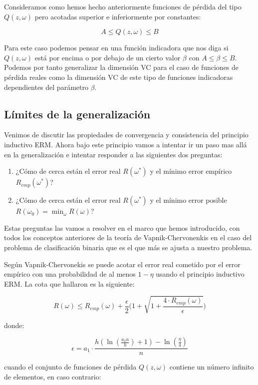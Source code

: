 Consideramos como hemos hecho anteriormente funciones de pérdida del tipo $Q(z,\omega)$ pero acotadas superior e inferiormente por constantes:

$$A\leq Q(z,\omega) \leq B$$

Para este caso podemos pensar en una función indicadora que nos diga si $Q(z,\omega)$ está por encima o por debajo de un cierto valor $\beta$ con $A\leq \beta \leq B$. Podemos por tanto generalizar la dimensión VC para el caso de funciones de pérdida reales como la dimensión VC de este tipo de funciones indicadoras dependientes del parámetro $\beta$.

\subsection{Límites de la generalización}

Venimos de discutir las propiedades de convergencia y consistencia del principio inductivo ERM. Ahora bajo este principio vamos a intentar ir un paso mas allá en la generalización e intentar responder a las siguientes dos preguntas:

\begin{enumerate}
	\item ¿Cómo de cerca están el error real $R(\omega^*)$ y el mínimo error empírico $R_{emp}(\omega^*)$?
	\item ¿Cómo de cerca están el error real $R(\omega^*)$ y el mínimo error posible $R(\omega_0) = \min_{\omega} R(\omega)$?
\end{enumerate}

Estas preguntas las vamos a resolver en el marco que hemos introducido, con todos los conceptos anteriores de la teoría de Vapnik-Chervonenkis en el caso del problema de clasificación binaria que es el que más se ajusta a nuestro problema.

Según Vapnik-Chervonekis se puede acotar el error real cometido por el error empírico con una probabilidad de al menos $1-\eta$ usando el principio inductivo ERM. La cota que hallaron es la siguiente:

$$R(\omega) \leq R_{emp}( \omega) + \frac{\epsilon}{2} \biggl( 1+\sqrt{1+\frac{4\cdot R_{emp}(\omega)}{\epsilon}} \biggl)$$

donde:

$$\epsilon = a_1 \cdot \frac{h(\ln (\frac{a_2 n}{h})+1) - \ln (\frac{\eta}{4})}{n}$$

cuando el conjunto de funciones de pérdida $Q(z, \omega)$ contiene un número infinito de elementos, en caso contrario:

